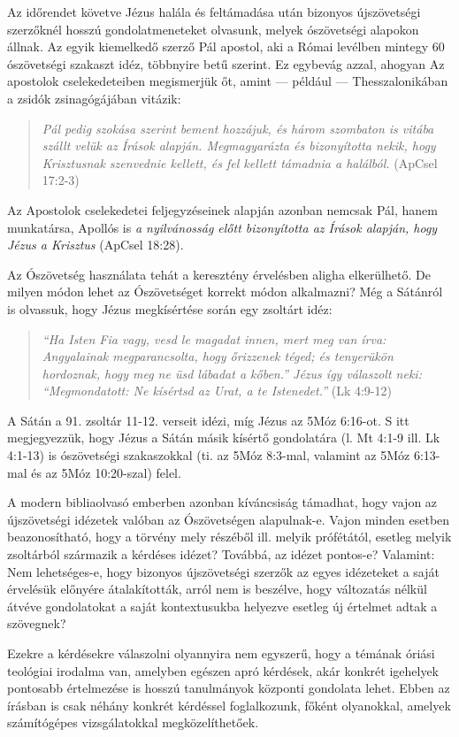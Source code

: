 \documentclass{article}
\begin{document}
Az időrendet követve Jézus halála és feltámadása után bizonyos újszövetségi szerzőknél hosszú gondolatmeneteket olvasunk,
melyek ószövetségi alapokon állnak. Az egyik kiemelkedő szerző Pál apostol, aki a Római levélben
mintegy 60 ószövetségi szakaszt idéz, többnyire betű szerint. Ez egybevág azzal, ahogyan
Az apostolok cselekedeteiben megismerjük őt, amint --- például --- Thesszalonikában a zsidók zsinagógájában
vitázik:
\begin{quote}
\textit{Pál pedig szokása szerint bement hozzájuk, és három szombaton is vitába
szállt velük az Írások alapján. Megmagyarázta és bizonyította nekik, hogy
Krisztusnak szenvednie kellett, és fel kellett támadnia a halálból.} (ApCsel 17:2-3)
\end{quote}
Az Apostolok cselekedetei feljegyzéseinek alapján azonban nemcsak Pál, hanem munkatársa,
Apollós is \textit{a nyilvánosság előtt bizonyította az Írások alapján, hogy Jézus a Krisztus}
(ApCsel 18:28). 

Az Ószövetség használata tehát a keresztény érvelésben aligha elkerülhető. De milyen módon lehet
az Ószövetséget korrekt módon alkalmazni? Még a Sátánról is olvassuk, hogy Jézus megkísértése
során egy zsoltárt idéz: 
\begin{quote}
\textit{``Ha Isten Fia vagy, vesd le magadat innen, mert meg van írva:
Angyalainak megparancsolta, hogy őrizzenek téged; 
és tenyerükön hordoznak, hogy meg ne üsd lábadat a kőben.''
Jézus így válaszolt neki: ``Megmondatott: Ne kísértsd az Urat, a te Istenedet.''} (Lk 4:9-12)
\end{quote}
A Sátán a 91. zsoltár 11-12. verseit idézi, míg Jézus az 5Móz 6:16-ot. S itt megjegyezzük,
hogy Jézus a Sátán másik kísértő gondolatára (l. Mt 4:1-9 ill. Lk 4:1-13) is ószövetségi szakaszokkal
(ti. az 5Móz 8:3-mal, valamint az 5Móz 6:13-mal és az 5Móz 10:20-szal) felel.

A modern bibliaolvasó emberben azonban kíváncsiság támadhat, hogy vajon az újszövetségi idézetek
valóban az Ószövetségen alapulnak-e. Vajon minden esetben beazonosítható, hogy a törvény mely
részéből ill. melyik prófétától, esetleg melyik zsoltárból származik a kérdéses idézet?
Továbbá, az idézet pontos-e? Valamint: Nem lehetséges-e, hogy bizonyos újszövetségi szerzők az egyes
idézeteket a saját érvelésük előnyére átalakították, arról nem is beszélve, hogy változatás
nélkül átvéve gondolatokat a saját kontextusukba helyezve esetleg új értelmet adtak a szövegnek?

Ezekre a kérdésekre válaszolni olyannyira nem egyszerű, hogy a témának óriási teológiai irodalma
van, amelyben egészen apró kérdések, akár konkrét igehelyek pontosabb értelmezése is
hosszú tanulmányok központi gondolata lehet. Ebben az írásban is csak néhány konkrét kérdéssel
foglalkozunk, főként olyanokkal, amelyek számítógépes vizsgálatokkal megközelíthetőek.
\end{document}
